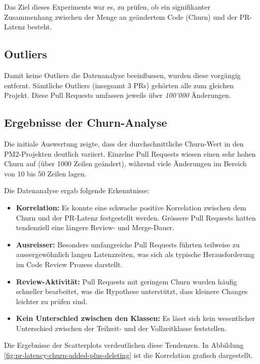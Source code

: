 Das Ziel dieses Experiments war es, zu prüfen, ob ein signifikanter Zusammenhang zwischen der Menge an geändertem Code (Churn) und der PR-Latenz besteht.

\subsection{Outliers}
Damit keine Outliers die Datenanalyse beeinflussen, wurden diese vorgängig entfernt. Sämtliche Outliers (insegsamt 3 PRs) gehörten alle zum gleichen Projekt. Diese Pull Requests umfassen jeweils über \textit{100'000} Änderungen. 

\subsection{Ergebnisse der Churn-Analyse}

Die initiale Auswertung zeigte, dass der durchschnittliche Churn-Wert in den PM2-Projekten deutlich variiert. Einzelne Pull Requests wiesen einen sehr hohen Churn auf (über 1000 Zeilen geändert), während viele Änderungen im Bereich von 10 bis 50 Zeilen lagen. 

Die Datenanalyse ergab folgende Erkenntnisse:

\begin{itemize}
    \item \textbf{Korrelation:} Es konnte eine schwache positive Korrelation zwischen dem Churn und der PR-Latenz festgestellt werden. Grössere Pull Requests hatten tendenziell eine längere Review- und Merge-Dauer.
    \item \textbf{Ausreisser:} Besonders umfangreiche Pull Requests führten teilweise zu aussergewöhnlich langen Latenzzeiten, was sich als typische Herausforderung im Code Review Prozess darstellt.
    \item \textbf{Review-Aktivität:} Pull Requests mit geringem Churn wurden häufig schneller bearbeitet, was die Hypothese unterstützt, dass kleinere Changes leichter zu prüfen sind.
    \item \textbf{Kein Unterschied zwischen den Klassen:} Es lässt sich kein wesentlicher Unterschied zwischen der Teilzeit- und der Vollzeitklasse feststellen.
\end{itemize}

Die Ergebnisse der Scatterplots verdeutlichen diese Tendenzen. In Abbildung \ref{fig:pr-latency-churn-added-plus-deleting} ist die Korrelation grafisch dargestellt.


